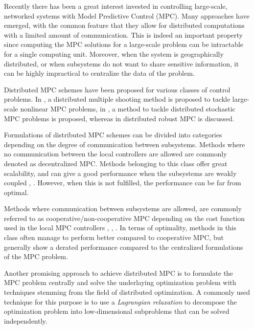 Recently there has been a great interest invested in controlling large-scale, networked systems with Model Predictive Control (MPC). Many approaches have emerged, with the common feature that they allow for distributed computations with a limited amount of communication. This is indeed an important property since computing the MPC solutions for a large-scale problem can be intractable for a single computing unit. Moreover, when the system is geographically distributed, or when subsystems do not want to share sensitive information, it can be highly impractical to centralize the data of the problem.

Distributed MPC schemes have been proposed for various classes of control problems. In \cite{Kozma2014}, a distributed multiple shooting method is proposed to tackle large-scale nonlinear MPC problems, in \cite{Perizzato2014}, a method to tackle distributed stochastic MPC problems is proposed, whereas in \cite{Conte2013} distributed robust MPC is discussed.

Formulations of distributed MPC schemes can be divided into categories depending on the degree of communication between subsystems. Methods where no communication between the local controllers are allowed are commonly denoted as decentralized MPC. Methods belonging to this class offer great scalability, and can give a good performance when the subsystems are weakly coupled \cite{Alessio2011}, \cite{Magni2006}. However, when this is not fulfilled, the performance can be far from optimal. 

Methods where communication between subsystems are allowed, are commonly referred to as cooperative/non-cooperative MPC depending on the cost function used in the local MPC controllers \cite{Venkat2005}, \cite{Rawlings2008}, \cite{Stewart2010}. In terms of optimality, methods in this class often manage to perform better compared to cooperative MPC, but generally show a derated performance compared to the centralized formulations of the MPC problem.


Another promising approach to achieve distributed MPC is to formulate the MPC problem centrally and solve the underlaying optimization problem with techniques stemming from the field of distributed optimization. A commonly used technique for this purpose is to use a \emph{Lagrangian relaxation} to decompose the optimization problem into low-dimensional subproblems that can be solved independently.

